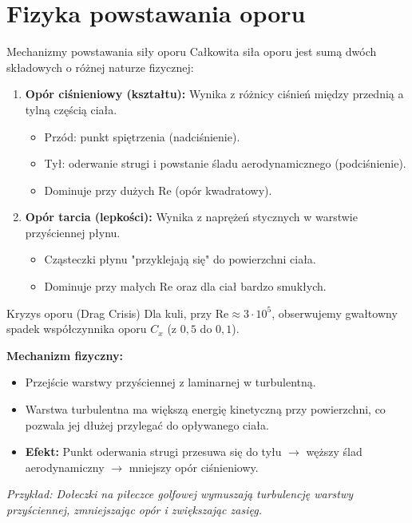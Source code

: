 \documentclass[10pt, aspectratio=43]{beamer}
\begin{document}
\section{Fizyka powstawania oporu}

\begin{frame}{Mechanizmy powstawania siły oporu}
    Całkowita siła oporu jest sumą dwóch składowych o różnej naturze fizycznej:
    
    \begin{enumerate}
        \item \textbf{Opór ciśnieniowy (kształtu):}
        Wynika z różnicy ciśnień między przednią a tylną częścią ciała.
        \begin{itemize}
            \item Przód: punkt spiętrzenia (nadciśnienie).
            \item Tył: oderwanie strugi i powstanie śladu aerodynamicznego (podciśnienie).
            \item Dominuje przy dużych $\mathrm{Re}$ (opór kwadratowy).
        \end{itemize}
        
        \item \textbf{Opór tarcia (lepkości):}
        Wynika z naprężeń stycznych w warstwie przyściennej płynu.
        \begin{itemize}
            \item Cząsteczki płynu "przyklejają się" do powierzchni ciała.
            \item Dominuje przy małych $\mathrm{Re}$ oraz dla ciał bardzo smukłych.
        \end{itemize}
    \end{enumerate}
\end{frame}

\begin{frame}{Kryzys oporu (Drag Crisis)}
    Dla kuli, przy $\mathrm{Re} \approx 3 \cdot 10^5$, obserwujemy gwałtowny spadek współczynnika oporu $C_x$ (z $0,5$ do $0,1$).
    
    \textbf{Mechanizm fizyczny:}
    \begin{itemize}
        \item Przejście warstwy przyściennej z laminarnej w turbulentną.
        \item Warstwa turbulentna ma większą energię kinetyczną przy powierzchni, co pozwala jej dłużej przylegać do opływanego ciała.
        \item \textbf{Efekt:} Punkt oderwania strugi przesuwa się do tyłu $\rightarrow$ węższy ślad aerodynamiczny $\rightarrow$ mniejszy opór ciśnieniowy.
    \end{itemize}
    
    \textit{Przykład: Dołeczki na piłeczce golfowej wymuszają turbulencję warstwy przyściennej, zmniejszając opór i zwiększając zasięg.}
\end{frame}
\end{document}
